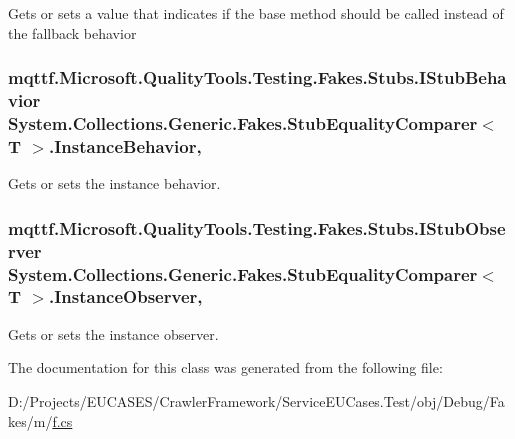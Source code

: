 Gets or sets a value that indicates if the base method should be called instead of the fallback behavior

\hypertarget{class_system_1_1_collections_1_1_generic_1_1_fakes_1_1_stub_equality_comparer_3_01_t_01_4_ad00447b05ab59859303ed88e565455d4}{
\subsubsection[{Instance\-Behavior}]{\setlength{\rightskip}{0pt plus 5cm}mqttf.\-Microsoft.\-Quality\-Tools.\-Testing.\-Fakes.\-Stubs.\-I\-Stub\-Behavior System.\-Collections.\-Generic.\-Fakes.\-Stub\-Equality\-Comparer$<$ T $>$.Instance\-Behavior\hspace{0.3cm}{\ttfamily [get]}, {\ttfamily [set]}}}\label{class_system_1_1_collections_1_1_generic_1_1_fakes_1_1_stub_equality_comparer_3_01_t_01_4_ad00447b05ab59859303ed88e565455d4}


Gets or sets the instance behavior.

\hypertarget{class_system_1_1_collections_1_1_generic_1_1_fakes_1_1_stub_equality_comparer_3_01_t_01_4_a248914a14a498b3ee2876b76883cebfd}{
\subsubsection[{Instance\-Observer}]{\setlength{\rightskip}{0pt plus 5cm}mqttf.\-Microsoft.\-Quality\-Tools.\-Testing.\-Fakes.\-Stubs.\-I\-Stub\-Observer System.\-Collections.\-Generic.\-Fakes.\-Stub\-Equality\-Comparer$<$ T $>$.Instance\-Observer\hspace{0.3cm}{\ttfamily [get]}, {\ttfamily [set]}}}\label{class_system_1_1_collections_1_1_generic_1_1_fakes_1_1_stub_equality_comparer_3_01_t_01_4_a248914a14a498b3ee2876b76883cebfd}


Gets or sets the instance observer.



The documentation for this class was generated from the following file\-:\begin{DoxyCompactItemize}
\item 
D\-:/\-Projects/\-E\-U\-C\-A\-S\-E\-S/\-Crawler\-Framework/\-Service\-E\-U\-Cases.\-Test/obj/\-Debug/\-Fakes/m/\hyperlink{m_2f_8cs}{f.\-cs}\end{DoxyCompactItemize}
